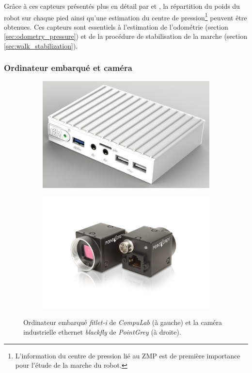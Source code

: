 Grâce à ces capteurs présentés plus en détail par \cite{ProjectsWorkshopHumanoids2015} et
\cite{PassaultThesis}, la répartition du poids du robot sur chaque pied
ainsi qu'une estimation du centre de pression\footnote{L'information du centre de pression
lié au ZMP est de première importance pour l'étude de la marche du robot.} peuvent être obtenues.
Ces capteurs sont essentiels à l'estimation de l'odométrie (section \ref{sec:odometry_pressure})
et de la procédure de stabilisation de la marche (section \ref{sec:walk_stabilization}).

\subsubsection{Ordinateur embarqué et caméra}

\begin{figure}[htb]
    \centerfloat
    \begin{subfigure}{0.35\paperwidth}
        \centering
        \includegraphics[width=0.8\linewidth]{../media/fitlet.jpg}
    \end{subfigure}
    \begin{subfigure}{0.35\paperwidth}
        \centering
        \includegraphics[width=0.8\linewidth]{../media/camera_blackfly.jpg}
    \end{subfigure}
    \caption{\label{fig:robot_pc_camera} 
        Ordinateur embarqué \textit{fitlet-i} de \textit{CompuLab} (à gauche) et 
        la caméra industrielle ethernet \textit{blackfly} de \textit{PointGrey} (à droite).
    }
\end{figure}

